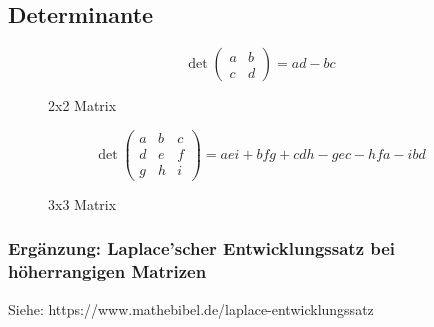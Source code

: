 \subsection{Determinante}
\begin{figure}[H]
    \begin{equation*}
        \det\begin{pmatrix}
        a & b \\
        c & d
        \end{pmatrix}
        = ad - bc
    \end{equation*}
    \caption*{2x2 Matrix}
\end{figure}

\begin{figure}[H]
    \begin{equation*}
        \det\begin{pmatrix}
        a & b & c \\
        d & e & f \\
        g & h & i
        \end{pmatrix}
        = aei + bfg + cdh - gec - hfa - ibd
    \end{equation*}
    \caption*{3x3 Matrix}
\end{figure}

\subsubsection*{Ergänzung: Laplace'scher Entwicklungssatz bei höherrangigen Matrizen}
Siehe: https://www.mathebibel.de/laplace-entwicklungssatz